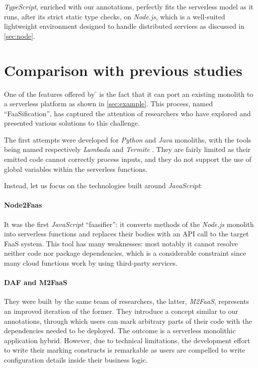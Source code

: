 \textit{TypeScript}, enriched with our annotations, perfectly fits
the serverless model as it runs, after its strict static type checks,
on \textit{Node.js}, which is a well-suited lightweight environment
designed to handle distributed services as discussed in \cref{sec:node}.

\section{Comparison with previous studies}

One of the features offered by \f{} is the fact that it can port
an existing monolith to a serverless platform as shown in \cref{sec:example}.
This process, named ``FaaSification'', has captured the attention of researchers
who have explored and presented various solutions to this challenge.

The first attempts were developed for \textit{Python} and \textit{Java} monoliths,
with the tools being named respectively \textit{Lambada} \cite{lambada} and \textit{Termite} \cite{termite}.
They are fairly limited as their emitted code cannot correctly process inputs,
and they do not support the use of global variables within the serverless functions.

Instead, let us focus on the technologies built around \textit{JavaScript}:

\paragraph{\textbf{Node2Faas} \cite{node2faas}}
It was the first \textit{JavaScript} ``faasifier'':
it converts methods of the \textit{Node.js} monolith into serverless
functions and replaces their bodies with an API call to the target FaaS system.
This tool has many weaknesses: most notably it cannot resolve neither code
nor package dependencies, which is a considerable constraint since many
cloud functions work by using third-party services.

\paragraph{\textbf{DAF} and \textbf{M2FaaS} \cite{daf, m2faas}}
They were built by the same team of researchers, the latter, \textit{M2FaaS},
represents an improved iteration of the former.
They introduce a concept similar to our annotations, through which users
can mark arbitrary parts of their code with the dependencies needed to be deployed.
The outcome is a serverless monolithic application hybrid. 
However, due to technical limitations, the development effort to write their marking constructs
is remarkable as users are compelled to write configuration details inside their business logic.

